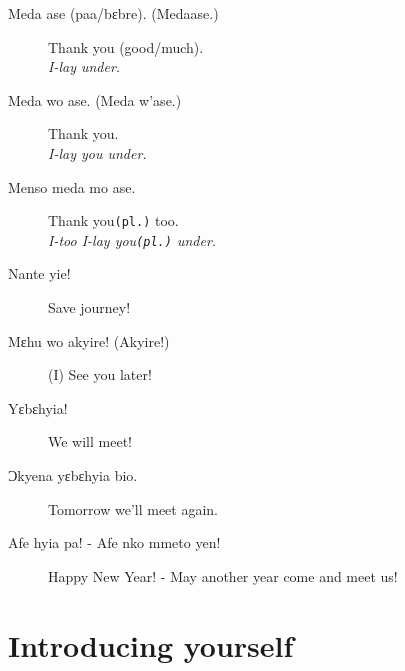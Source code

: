 \documentclass[%
 fontsize=11pt,%
 a5paper,pagesize,
 paper=a5,%
 DIV=9,%
 parskip=half*,%
 twoside=true,
 pointlessnumbers
]{scrbook}%
\begin{document}
\begin{description}
  
  \item[Meda ase (paa/bɛbre). (Medaase.)] Thank you (good/much). \\
    \textit{I-lay under.}
  \item[Meda wo ase. (Meda w'ase.)] Thank you. \\
    \textit{I-lay you under.}
  \item[Menso meda mo ase.] Thank you\texttt{(pl.)} too. \\
    \textit{I-too I-lay you\texttt{(pl.)} under.}
  \item[Nante yie!] Save journey!
  \item[Mεhu wo akyire! (Akyire!)] (I) See you later!
  \item[Yɛbɛhyia!] We will meet!
  \item[Ɔkyena yɛbɛhyia bio.] Tomorrow we'll meet again.
  \item[Afe hyia pa! - Afe nko mmeto yen!] Happy New Year! - May another year come and meet us!

\end{description}

\chapter{Introducing yourself}
\end{document}
